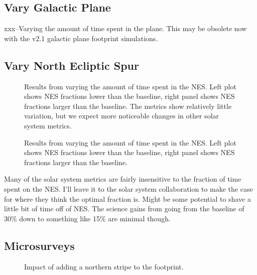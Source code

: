 \subsection{Vary Galactic Plane}

xxx--Varying the amount of time spent in the plane. This may be obsolete now with the v2.1 galactic plane footprint simulations. 


\subsection{Vary North Ecliptic Spur}

\begin{figure}
\caption{Results from varying the amount of time spent in the NES. Left plot shows NES fractions lower than the baseline, right panel shows NES fractions larger than the baseline. The metrics show relatively little variation, but we expect more noticeable changes in other solar system metrics. \label{fig:vary_nes}}
\end{figure}

\begin{figure}
\caption{Results from varying the amount of time spent in the NES. Left plot shows NES fractions lower than the baseline, right panel shows NES fractions larger than the baseline.\label{fig:vary_nes_mags}}
\end{figure}


Many of the solar system metrics are fairly insensitive to the fraction of time spent on the NES. I'll leave it to the solar system collaboration to make the case for where they think the optimal fraction is. Might be some potential to shave a little bit of time off of NES. The science gains from going from the baseline of 30\% down to something like 15\% are minimal though.


\subsection{Microsurveys}

\begin{figure}
\caption{Impact of adding a northern stripe to the footprint. \label{fig:north_stripe} }
\end{figure}



